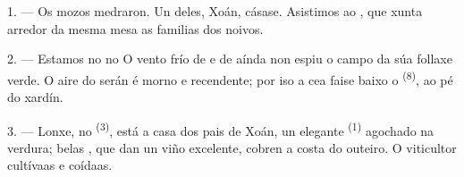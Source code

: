 %
%

\VUsaut{4.0mm}
\VUsaut{1.6mm}
\VUsaut{3.2mm}

\VUsaut{1.6mm}
\VUsaut{2.6mm}

\VUsaut{3.0mm}

1. --- Os mozos medraron. Un deles, Xoán, cásase. Asistimos ao , que xunta arredor da mesma mesa as familias dos noivos.

2. --- Estamos no  no  O vento frío de
 e de  aínda non espiu o campo da súa follaxe verde.
O aire do serán é morno e recendente; por iso a cea faise baixo o 
\textsuperscript{(8)}, ao pé do xardín.

3. --- Lonxe, no  \textsuperscript{(3)}, está a casa dos pais de
Xoán, un elegante  \textsuperscript{(1)} agochado na verdura; belas
, que dan un viño excelente, cobren a costa do outeiro. O viticultor
cultívaas e coídaas.

